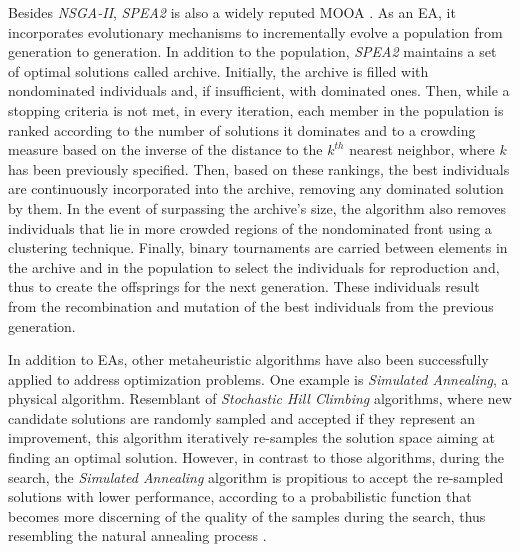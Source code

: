 	Besides \textit{\ac{NSGA-II}}, \textit{\ac{SPEA2}} is also a widely reputed \ac{MOOA} \cite{Zitzler2001SPEA2}. As an \ac{EA}, it incorporates evolutionary mechanisms to incrementally evolve a population from generation to generation. In addition to the population, \textit{\ac{SPEA2}} maintains a set of optimal solutions called archive. Initially, the archive is filled with nondominated individuals and, if insufficient, with dominated ones. Then, while a stopping criteria is not met, in every iteration, each member in the population is ranked according to the number of solutions it dominates and to a crowding measure based on the inverse of the distance to the $k^{th}$ nearest neighbor, where $k$ has been previously specified. 
	Then, based on these rankings, the best individuals are continuously incorporated into the archive, removing any dominated solution by them. In the event of surpassing the archive's size, the algorithm also removes individuals that lie in more crowded regions of the nondominated front using a clustering technique. Finally, binary tournaments are carried between elements in the archive and in the population to select the individuals for reproduction and, thus to create the offsprings for the next generation. These individuals result from the recombination and mutation of the best individuals from the previous generation. 
		
	In addition to \acp{EA}, other metaheuristic algorithms have also been successfully applied to address optimization problems. One example is \textit{Simulated Annealing}, a physical algorithm. Resemblant of \textit{Stochastic Hill Climbing} algorithms, where new candidate solutions are randomly sampled and accepted if they represent an improvement, this algorithm iteratively re-samples the solution space aiming at finding an optimal solution. However, in contrast to those algorithms, during the search, the \textit{Simulated Annealing} algorithm is propitious to accept the re-sampled solutions with lower performance, according to a probabilistic function that becomes more discerning of the quality of the samples during the search, thus resembling the natural annealing process \cite{Brownlee2011}. 
	
